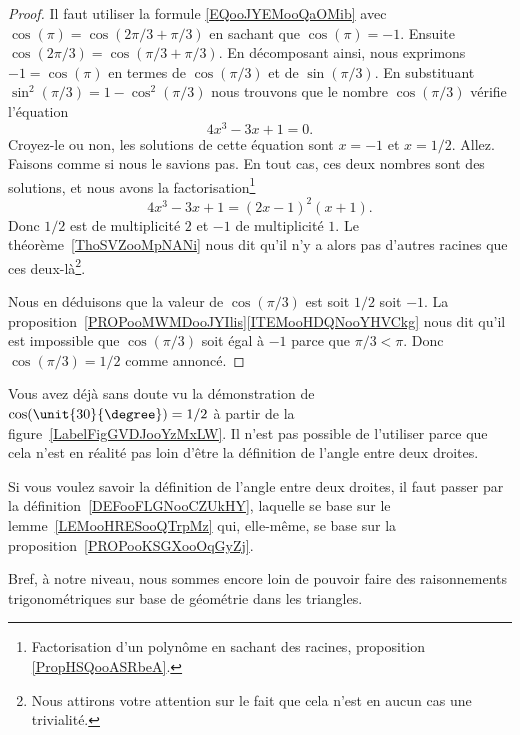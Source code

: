 \begin{proof}
    Il faut utiliser la formule \eqref{EQooJYEMooQaOMib} avec \( \cos(\pi)=\cos(2\pi/3+\pi/3)\) en sachant que \( \cos(\pi)=-1\). Ensuite \( \cos(2\pi/3)=\cos(\pi/3+\pi/3)\). En décomposant ainsi, nous exprimons \( -1=\cos(\pi)\) en termes de \( \cos(\pi/3)\) et de \( \sin(\pi/3)\). En substituant \( \sin^2(\pi/3)=1-\cos^2(\pi/3)\) nous trouvons que le nombre \( \cos(\pi/3)\) vérifie l'équation
    \begin{equation}
        4x^3-3x+1=0.
    \end{equation}
    Croyez-le ou non, les solutions de cette équation sont \( x=-1\) et \( x=1/2\). Allez. Faisons comme si nous le savions pas. En tout cas, ces deux nombres sont des solutions, et nous avons la factorisation\footnote{Factorisation d'un polynôme en sachant des racines, proposition \ref{PropHSQooASRbeA}.}
    \begin{equation}
        4x^3-3x+1=(2x-1)^2(x+1).
    \end{equation}
    Donc \( 1/2\) est de multiplicité \( 2\) et \( -1\) de multiplicité \( 1\). Le théorème~\ref{ThoSVZooMpNANi} nous dit qu'il n'y a alors pas d'autres racines que ces deux-là\footnote{Nous attirons votre attention sur le fait que cela n'est en aucun cas une trivialité.}.

    Nous en déduisons que la valeur de \( \cos(\pi/3)\) est soit \( 1/2\) soit \( -1\). La proposition~\ref{PROPooMWMDooJYIlis}\ref{ITEMooHDQNooYHVCkg} nous dit qu'il est impossible que \( \cos(\pi/3)\) soit égal à \( -1\) parce que \( \pi/3<\pi\). Donc \( \cos(\pi/3)=1/2\) comme annoncé.
\end{proof}

\begin{remark}
    Vous avez déjà sans doute vu la démonstration de \( \cos(\unit{30}{\degree})=1/2\) à partir de la figure~\ref{LabelFigGVDJooYzMxLW}. Il n'est pas possible de l'utiliser parce que cela n'est en réalité pas loin d'être la définition de l'angle entre deux droites.

    Si vous voulez savoir la définition de l'angle entre deux droites, il faut passer par la définition~\ref{DEFooFLGNooCZUkHY}, laquelle se base sur le lemme~\ref{LEMooHRESooQTrpMz} qui, elle-même, se base sur la proposition~\ref{PROPooKSGXooOqGyZj}.

    Bref, à notre niveau, nous sommes encore loin de pouvoir faire des raisonnements trigonométriques sur base de géométrie dans les triangles.
\end{remark}

